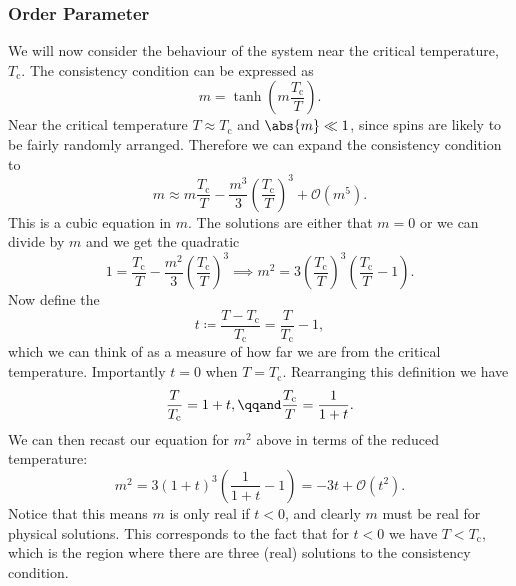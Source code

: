 \documentclass[fleqn]{NotesClass}
\newcommand*{\order}{\mathcal{O}}
\begin{document}
    \subsubsection{Order Parameter}
    We will now consider the behaviour of the system near the critical temperature, \(T_{\mathrm{c}}\).
    The consistency condition can be expressed as
    \begin{equation}
        m = \tanh\left( m\frac{T_{\mathrm{c}}}{T} \right).
    \end{equation}
    Near the critical temperature \(T \approx T_{\mathrm{c}}\) and \(\abs{m} \ll 1\), since spins are likely to be fairly randomly arranged.
    Therefore we can expand the consistency condition to
    \begin{equation}
        m \approx m\frac{T_{\mathrm{c}}}{T} - \frac{m^3}{3} \left( \frac{T_{\mathrm{c}}}{T} \right)^3 + \order(m^5).
    \end{equation}
    This is a cubic equation in \(m\).
    The solutions are either that \(m = 0\) or we can divide by \(m\) and we get the quadratic
    \begin{equation}
        1 = \frac{T_{\mathrm{c}}}{T} - \frac{m^2}{3}\left( \frac{T_{\mathrm{c}}}{T} \right)^3 \implies m^2 = 3\left( \frac{T_{\mathrm{c}}}{T} \right)^3 \left( \frac{T_{\mathrm{c}}}{T} - 1 \right).
    \end{equation}
    Now define the 
    \begin{equation}
        t \coloneqq \frac{T - T_{\mathrm{c}}}{T_{\mathrm{c}}} = \frac{T}{T_{\mathrm{c}}} - 1,
    \end{equation}
    which we can think of as a measure of how far we are from the critical temperature.
    Importantly \(t = 0\) when \(T = T_{\mathrm{c}}\).
    Rearranging this definition we have
    \begin{equation}
        \frac{T}{T_{\mathrm{c}}} = 1 + t, \qqand \frac{T_{\mathrm{c}}}{T} = \frac{1}{1 + t}.
    \end{equation}
    We can then recast our equation for \(m^2\) above in terms of the reduced temperature:
    \begin{equation}
        m^2 = 3(1 + t)^3\left( \frac{1}{1 + t} - 1 \right) = -3t + \order(t^2).
    \end{equation}
    Notice that this means \(m\) is only real if \(t < 0\), and clearly \(m\) must be real for physical solutions.
    This corresponds to the fact that for \(t < 0\) we have \(T < T_{\mathrm{c}}\), which is the region where there are three (real) solutions to the consistency condition.
    
\end{document}
